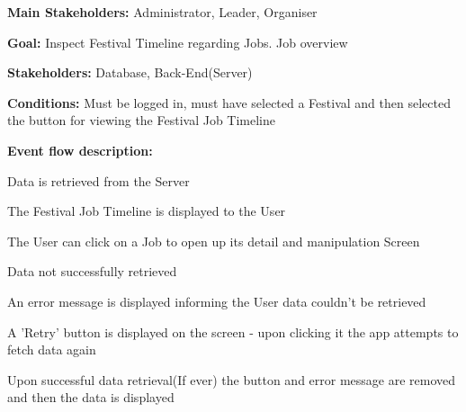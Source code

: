 			\noindent {}
			\begin{packed_item}
				\item \textbf{Main Stakeholders:} Administrator, Leader, Organiser
				\item \textbf{Goal:} Inspect Festival Timeline regarding Jobs. Job overview
				\item \textbf{Stakeholders: } Database, Back-End(Server)
				\item \textbf{Conditions: } Must be logged in, must have selected a Festival and then selected the button for viewing the Festival Job Timeline
				\item \textbf{Event flow description: }
				\begin{packed_enum}
					\item Data is retrieved from the Server
					\item The Festival Job Timeline is displayed to the User
					\item The User can click on a Job to open up its detail and manipulation Screen
				\end{packed_enum}
				
				\begin{packed_item}
					\item[1.a] Data not successfully retrieved
					\item[] \begin{packed_enum}
						\item An error message is displayed informing the User data couldn't be retrieved
						\item A 'Retry' button is displayed on the screen - upon clicking it the app attempts to fetch data again
						\item Upon successful data retrieval(If ever) the button and error message are removed and then the data is displayed
					\end{packed_enum}
				\end{packed_item}
			\end{packed_item}
		
